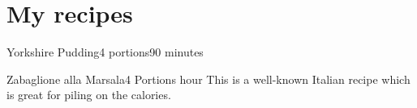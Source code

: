 \section{My recipes}


\begin{recipe}{Yorkshire Pudding}{4 portions}{90 minutes}
\end{recipe}


\begin{recipe}[Zabaglione]{Zabaglione alla Marsala}{4 Portions}{ hour}
\freeform This is a well-known Italian recipe which is
great for piling on the calories.
\end{recipe}
